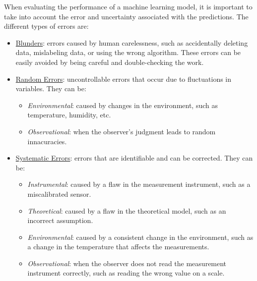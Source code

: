 When evaluating the performance of a machine learning model, it is important to take into account the error and uncertainty associated with the predictions. The different types of errors are:
\begin{itemize}
    \item \ul{Blunders}: errors caused by human carelessness, such as accidentally deleting data, mislabeling data, or using the wrong algorithm. These errors can be easily avoided by being careful and double-checking the work.
    \item \ul{Random Errors}: uncontrollable errors that occur due to fluctuations in variables. They can be:
    \begin{itemize}
        \item \emph{Environmental}: caused by changes in the environment, such as temperature, humidity, etc.
        \item \emph{Observational}: when the observer's judgment leads to random innacuracies.
    \end{itemize}
    \item \ul{Systematic Errors}: errors that are identifiable and can be corrected. They can be:
    \begin{itemize}
        \item \emph{Instrumental}: caused by a flaw in the measurement instrument, such as a miscalibrated sensor.
        \item \emph{Theoretical}: caused by a flaw in the theoretical model, such as an incorrect assumption.
        \item \emph{Environmental}: caused by a consistent change in the environment, such as a change in the temperature that affects the measurements.
        \item \emph{Observational}: when the observer does not read the measurement instrument correctly, such as reading the wrong value on a scale.
    \end{itemize}
\end{itemize}


